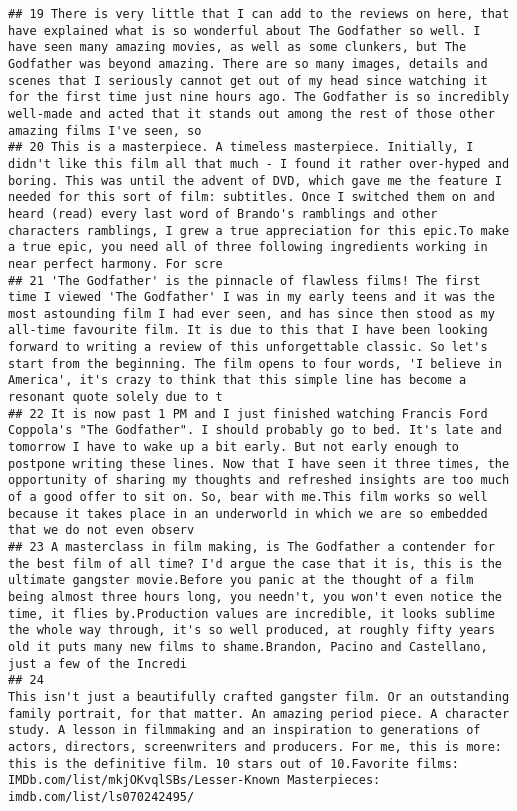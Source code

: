 \documentclass[
]{article}
\begin{document}
\begin{verbatim}
## 19 There is very little that I can add to the reviews on here, that have explained what is so wonderful about The Godfather so well. I have seen many amazing movies, as well as some clunkers, but The Godfather was beyond amazing. There are so many images, details and scenes that I seriously cannot get out of my head since watching it for the first time just nine hours ago. The Godfather is so incredibly well-made and acted that it stands out among the rest of those other amazing films I've seen, so
## 20 This is a masterpiece. A timeless masterpiece. Initially, I didn't like this film all that much - I found it rather over-hyped and boring. This was until the advent of DVD, which gave me the feature I needed for this sort of film: subtitles. Once I switched them on and heard (read) every last word of Brando's ramblings and other characters ramblings, I grew a true appreciation for this epic.To make a true epic, you need all of three following ingredients working in near perfect harmony. For scre
## 21 'The Godfather' is the pinnacle of flawless films! The first time I viewed 'The Godfather' I was in my early teens and it was the most astounding film I had ever seen, and has since then stood as my all-time favourite film. It is due to this that I have been looking forward to writing a review of this unforgettable classic. So let's start from the beginning. The film opens to four words, 'I believe in America', it's crazy to think that this simple line has become a resonant quote solely due to t
## 22 It is now past 1 PM and I just finished watching Francis Ford Coppola's "The Godfather". I should probably go to bed. It's late and tomorrow I have to wake up a bit early. But not early enough to postpone writing these lines. Now that I have seen it three times, the opportunity of sharing my thoughts and refreshed insights are too much of a good offer to sit on. So, bear with me.This film works so well because it takes place in an underworld in which we are so embedded that we do not even observ
## 23 A masterclass in film making, is The Godfather a contender for the best film of all time? I'd argue the case that it is, this is the ultimate gangster movie.Before you panic at the thought of a film being almost three hours long, you needn't, you won't even notice the time, it flies by.Production values are incredible, it looks sublime the whole way through, it's so well produced, at roughly fifty years old it puts many new films to shame.Brandon, Pacino and Castellano, just a few of the Incredi
## 24                                                                               This isn't just a beautifully crafted gangster film. Or an outstanding family portrait, for that matter. An amazing period piece. A character study. A lesson in filmmaking and an inspiration to generations of actors, directors, screenwriters and producers. For me, this is more: this is the definitive film. 10 stars out of 10.Favorite films: IMDb.com/list/mkjOKvqlSBs/Lesser-Known Masterpieces: imdb.com/list/ls070242495/

\end{verbatim}
\end{document}
